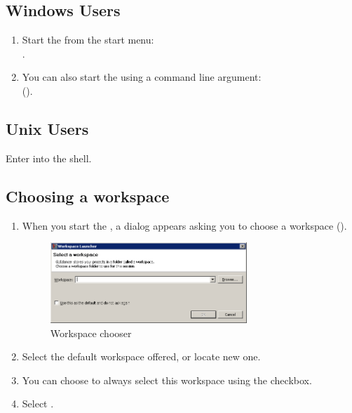

\subsection{Windows Users}
\begin{enumerate}
\item Start the \ite{}  from the start menu:\\
.

\item You can also start the \ite{} using a command line argument:\\ 
(). 
\end{enumerate}

\subsection{Unix Users}
Enter \bxshell{\app{}} into the shell. 

\subsection{Choosing a workspace}
\begin{enumerate}
\item When you start the \ite{}, a dialog appears asking you to choose a workspace ().

\begin{figure}[h]
\begin{center}
\includegraphics[width=0.7\textwidth]{Tasks/Start/PS/workspacechooser}
\caption{Workspace chooser}
\label{WorkspaceChooser}
\end{center}
\end{figure}

\item Select the default workspace offered, or locate new one. 
\item You can choose to always select this workspace using the checkbox.
 \item Select .
 \end{enumerate}

